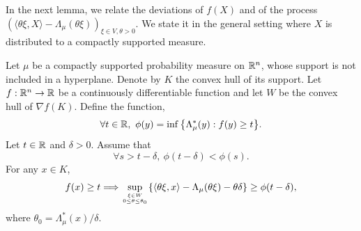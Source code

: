 \documentclass[a4paper,oneside,11pt]{article}
\begin{document}
In the next lemma, we relate the deviations of $f(X)$ and of the process $(\langle \theta \xi, X\rangle - \Lambda_\mu(\theta \xi))_{ \xi \in V, \theta>0}$. We state it in the general setting where $X$ is distributed to a compactly supported measure.
\begin{Lem}
Let $\mu$ be a compactly supported probability measure on $\mathbb{R}^n$, whose support is not included in a hyperplane. Denote by $K$ the convex hull of its support. Let $f :\mathbb{R}^n \to \mathbb{R}$ be a continuously differentiable function and let $W$ be the convex hull of $\nabla f(K)$. Define the function,
$$ \forall t \in \RR, \ \phi(y) = \inf \big\{ \Lambda^*_\mu(y) : f(y) \geq t \big\}.$$ 
 Let $t\in \mathbb{R}$ and $\delta>0$. Assume that 
$$ \forall s > t-\delta, \ \phi(t-\delta) < \phi(s).$$
For any $x \in K$,
$$  f(x) \geq t \Longrightarrow  \sup_{\xi \in W \atop 0\leq \theta \leq \theta_0} \{ \langle \theta \xi, x\rangle - \Lambda_\mu(\theta \xi) - \theta \delta\} \geq \phi(t-\delta),$$
where $\theta_0 = \Lambda^*_\mu(x) / \delta$.
\end{Lem}
\end{document}
